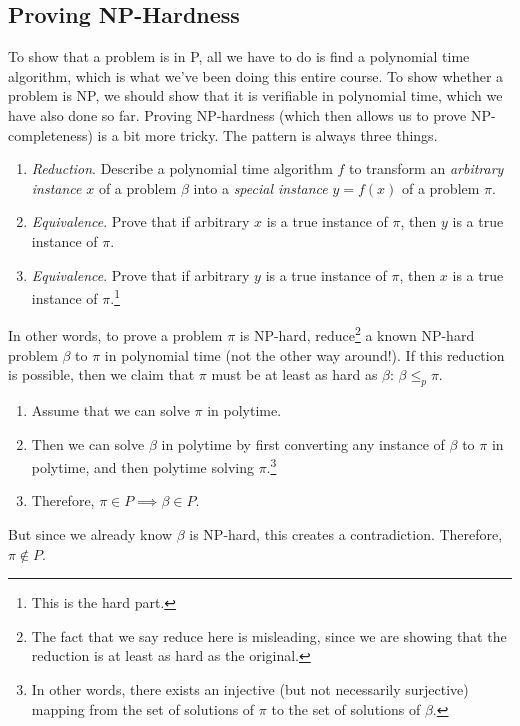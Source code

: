 \subsection{Proving NP-Hardness}

  To show that a problem is in P, all we have to do is find a polynomial time algorithm, which is what we've been doing this entire course. To show whether a problem is NP, we should show that it is verifiable in polynomial time, which we have also done so far. Proving NP-hardness (which then allows us to prove NP-completeness) is a bit more tricky. The pattern is always three things. 
  \begin{enumerate}
    \item \textit{Reduction}. Describe a polynomial time algorithm $f$ to transform an \textit{arbitrary instance} $x$ of a problem $\beta$ into a \textit{special instance} $y = f(x)$ of a problem $\pi$. 
    \item \textit{Equivalence}. Prove that if arbitrary $x$ is a true instance of $\pi$, then $y$ is a true instance of $\pi$. 
    \item \textit{Equivalence}. Prove that if arbitrary $y$ is a true instance of $\pi$, then $x$ is a true instance of $\pi$.\footnote{This is the hard part.} 
  \end{enumerate}

  \begin{definition}[Reduction]
    In other words, to prove a problem $\pi$ is NP-hard, reduce\footnote{The fact that we say reduce here is misleading, since we are showing that the reduction is at least as hard as the original.} a known NP-hard problem $\beta$ to $\pi$ in polynomial time (not the other way around!). If this reduction is possible, then we claim that $\pi$ must be at least as hard as $\beta$: $\beta \leq_p \pi$. 
    \begin{enumerate}
      \item Assume that we can solve $\pi$ in polytime. 
      \item Then we can solve $\beta$ in polytime by first converting any instance of $\beta$ to $\pi$ in polytime, and then polytime solving $\pi$.\footnote{In other words, there exists an injective (but not necessarily surjective) mapping from the set of solutions of $\pi$ to the set of solutions of $\beta$. }
      \item Therefore, $\pi \in P \implies \beta \in P$. 
    \end{enumerate}
    But since we already know $\beta$ is NP-hard, this creates a contradiction. Therefore, $\pi \not\in P$. 
  \end{definition}

